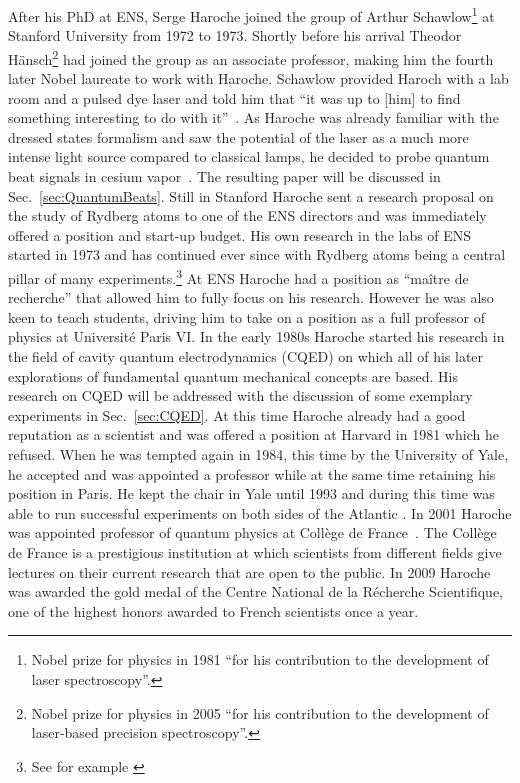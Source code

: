 After his PhD at ENS, Serge Haroche joined the group of Arthur
  Schawlow\footnote{Nobel prize for physics in 1981 ``for his contribution to
  the development of laser spectroscopy''. } at
Stanford University from 1972 to 1973. Shortly before his arrival Theodor
Hänsch\footnote{Nobel prize for physics in 2005 ``for his contribution to the
development of laser-based precision spectroscopy''.}
had joined the group as an associate professor, making him the fourth later
Nobel laureate to work with Haroche. Schawlow provided Haroch with a lab room and a pulsed dye
laser and told him that ``it was up to [him] to find something
interesting to do with it''~\cite{shbio}. As Haroche was already familiar with
the dressed states formalism and saw the potential of the laser as a much more
intense light source compared to classical lamps, he decided to probe
quantum beat signals in  cesium vapor~\cite{haroche1973hyperfine}. The resulting
paper will be discussed in Sec.~\ref{sec:QuantumBeats}. Still in Stanford
Haroche sent a research proposal on the study of Rydberg atoms to one of the ENS
directors and was immediately offered a position and start-up budget. His own
research in the labs of ENS started in 1973 and has continued ever since with
Rydberg atoms being a central pillar of many experiments.\footnote{See for example
\cite{haroche1983EnhancedSpontEm,haroche1990QND,haroche1999SinglePhoton,haroche2007QuantumJumps}}
At ENS Haroche had a position as ``maître de recherche'' that allowed him to
fully focus on his research. However he was also keen to teach students, 
driving him to take on a position as a full professor of physics at Université
Paris VI. In the early 1980s Haroche started his research in the field of cavity
quantum electrodynamics (CQED) on which all of his later explorations of
fundamental quantum mechanical concepts are based. His research on CQED will be
addressed with the discussion of some exemplary experiments in
Sec.~\ref{sec:CQED}. At this time Haroche already had a good reputation as a
scientist and was offered a position at Harvard in 1981 which he refused. When he
was tempted again in 1984, this time by the University of Yale, he accepted and
was appointed a professor while at the same time retaining his position in
Paris. He kept the chair in Yale until 1993 and during this time was able to run
successful experiments on both sides of the Atlantic
\cite{haroche1983EnhancedSpontEm, haroche1987SupressedEmission}. In 2001 Haroche
was appointed professor of quantum physics at Collège de
France~\cite{harocheCollege}. The Collège de France is a prestigious institution
at which scientists from different fields give lectures on their current
research that are open to the public. In 2009 Haroche was awarded the gold medal
of the Centre National de la Récherche Scientifique, one of the highest honors
awarded to French scientists once a year.

